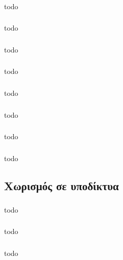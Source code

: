 \documentclass[a4paper, 12pt]{article}
\begin{document}
		\subsubsection{}
			todo

		\subsubsection{}
			todo

		\subsubsection{}
			todo

		\subsubsection{}
			todo

		\subsubsection{}
			todo

		\subsubsection{}
			todo

		\subsubsection{}
			todo

		\subsubsection{}
			todo

	\subsection{Χωρισμός σε υποδίκτυα}

		\subsubsection{}
			todo

		\subsubsection{}
			todo

		\subsubsection{}
			todo
\end{document}
